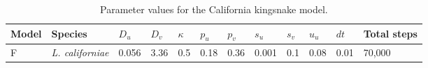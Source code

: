 \begin{table}[h]
	\centering
	\begin{tabular}{|l|l|l|l|l|l|l|l|l|l|l|l|}
	\hline
	Model & Species &$D_u$ &$D_v$ &$\kappa$ &$p_u$ &$p_v$ &$s_u$ &$s_v$  &$u_u$ &$dt$ &Total steps\\ \hline 
	F     &\textit{L. californiae} &0.056 &3.36 &0.5 &0.18 &0.36 &0.001 &0.1 &0.08 &0.01 &70,000                \\ \hline
	\end{tabular}
	\caption {Parameter values for the California kingsnake model.}
	\label{tab:snakeParameters}
\end{table}